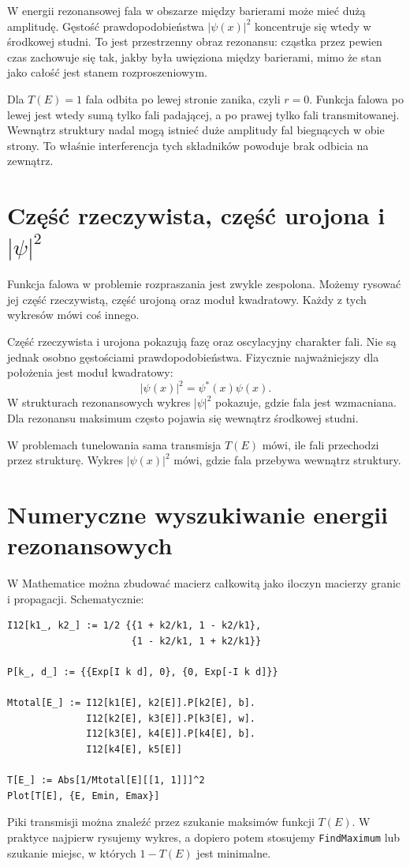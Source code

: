 W energii rezonansowej fala w obszarze między barierami może mieć dużą amplitudę. Gęstość prawdopodobieństwa \(|\psi(x)|^2\) koncentruje się wtedy w środkowej studni. To jest przestrzenny obraz rezonansu: cząstka przez pewien czas zachowuje się tak, jakby była uwięziona między barierami, mimo że stan jako całość jest stanem rozproszeniowym.

Dla \(T(E)=1\) fala odbita po lewej stronie zanika, czyli \(r=0\). Funkcja falowa po lewej jest wtedy sumą tylko fali padającej, a po prawej tylko fali transmitowanej. Wewnątrz struktury nadal mogą istnieć duże amplitudy fal biegnących w obie strony. To właśnie interferencja tych składników powoduje brak odbicia na zewnątrz.

\section{Część rzeczywista, część urojona i \texorpdfstring{\(|\psi|^2\)}{|psi|^2}}

Funkcja falowa w problemie rozpraszania jest zwykle zespolona. Możemy rysować jej część rzeczywistą, część urojoną oraz moduł kwadratowy. Każdy z tych wykresów mówi coś innego.

Część rzeczywista i urojona pokazują fazę oraz oscylacyjny charakter fali. Nie są jednak osobno gęstościami prawdopodobieństwa. Fizycznie najważniejszy dla położenia jest moduł kwadratowy:
\begin{equation}
    |\psi(x)|^2=\psi^*(x)\psi(x).
\end{equation}
W strukturach rezonansowych wykres \(|\psi|^2\) pokazuje, gdzie fala jest wzmacniana. Dla rezonansu maksimum często pojawia się wewnątrz środkowej studni.

\begin{summarybox}
W problemach tunelowania sama transmisja \(T(E)\) mówi, ile fali przechodzi przez strukturę. Wykres \(|\psi(x)|^2\) mówi, gdzie fala przebywa wewnątrz struktury.
\end{summarybox}

\section{Numeryczne wyszukiwanie energii rezonansowych}

W Mathematice można zbudować macierz całkowitą jako iloczyn macierzy granic i propagacji. Schematycznie:
\begin{verbatim}
I12[k1_, k2_] := 1/2 {{1 + k2/k1, 1 - k2/k1},
                      {1 - k2/k1, 1 + k2/k1}}

P[k_, d_] := {{Exp[I k d], 0}, {0, Exp[-I k d]}}

Mtotal[E_] := I12[k1[E], k2[E]].P[k2[E], b].
              I12[k2[E], k3[E]].P[k3[E], w].
              I12[k3[E], k4[E]].P[k4[E], b].
              I12[k4[E], k5[E]]

T[E_] := Abs[1/Mtotal[E][[1, 1]]]^2
Plot[T[E], {E, Emin, Emax}]
\end{verbatim}
Piki transmisji można znaleźć przez szukanie maksimów funkcji \(T(E)\). W praktyce najpierw rysujemy wykres, a dopiero potem stosujemy \texttt{FindMaximum} lub szukanie miejsc, w których \(1-T(E)\) jest minimalne.

